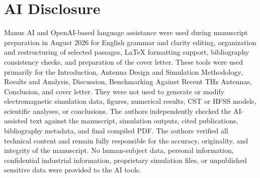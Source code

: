 \documentclass[draft]{agujournal2019}
\begin{document}
\section*{AI Disclosure}
Manus AI and OpenAI-based language assistance were used during manuscript preparation in August 2026 for English grammar and clarity editing, organization and restructuring of selected passages, LaTeX formatting support, bibliography consistency checks, and preparation of the cover letter. These tools were used primarily for the Introduction, Antenna Design and Simulation Methodology, Results and Analysis, Discussion, Benchmarking Against Recent THz Antennas, Conclusion, and cover letter. They were not used to generate or modify electromagnetic simulation data, figures, numerical results, CST or HFSS models, scientific analyses, or conclusions. The authors independently checked the AI-assisted text against the manuscript, simulation outputs, cited publications, bibliography metadata, and final compiled PDF. The authors verified all technical content and remain fully responsible for the accuracy, originality, and integrity of the manuscript. No human-subject data, personal information, confidential industrial information, proprietary simulation files, or unpublished sensitive data were provided to the AI tools.


\end{document}

